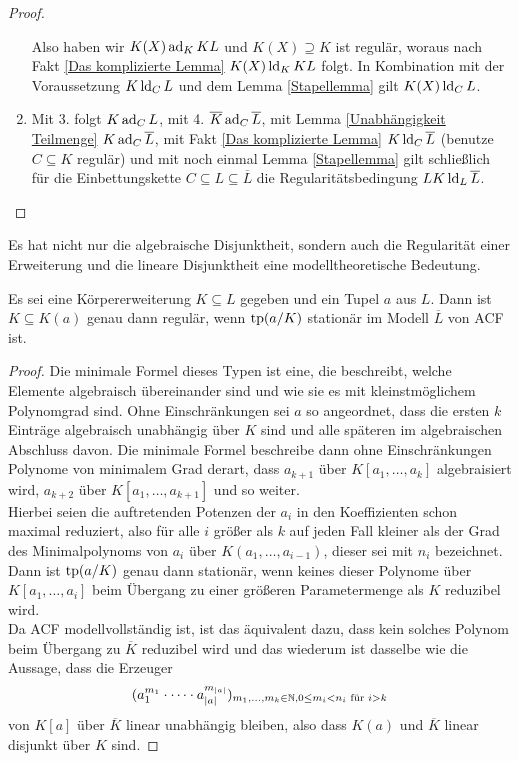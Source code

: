 \begin{proof}
\begin{enumerate}
    		Also haben wir $K(X)\operatorname{ad}_KKL$ und $K(X)\supseteq K$ ist regulär, woraus nach Fakt \ref{Das komplizierte Lemma} $K(X)\operatorname{ld}_KKL$ folgt. In Kombination mit der Voraussetzung $K\operatorname{ld}_CL$ und dem Lemma \ref{Stapellemma} gilt $K(X)\operatorname{ld}_CL$.
    		\item Mit 3. folgt $K\operatorname{ad}_CL$, mit 4. $\overline{K}\operatorname{ad}_C\overline{L}$, mit Lemma \ref{Unabhängigkeit Teilmenge} $K\operatorname{ad}_C\overline{L}$, mit Fakt \ref{Das komplizierte Lemma} $K\operatorname{ld}_C\overline{L}$ (benutze $C\subseteq K$ regulär) und mit noch einmal Lemma \ref{Stapellemma} gilt schließlich für die Einbettungskette $C\subseteq L\subseteq\overline{L}$ die Regularitätsbedingung $LK\operatorname{ld}_L\overline{L}$.
    	\end{enumerate}
    \end{proof}
    
    Es hat nicht nur die algebraische Disjunktheit, sondern auch die Regularität einer Erweiterung und die lineare Disjunktheit eine modelltheoretische Bedeutung.
    
    \begin{lemma}
    	Es sei eine Körpererweiterung $K\subseteq L$ gegeben und ein Tupel $a$ aus $L$. Dann ist $K\subseteq K(a)$ genau dann regulär, wenn $\operatorname{tp}(a/K)$ stationär im Modell $\overline{L}$ von ACF ist.
    \end{lemma}
    \begin{proof}
    	Die minimale Formel dieses Typen ist eine, die beschreibt, welche Elemente algebraisch übereinander sind und wie sie es mit kleinstmöglichem Polynomgrad sind. Ohne Einschränkungen sei $a$ so angeordnet, dass die ersten $k$ Einträge algebraisch unabhängig über $K$ sind und alle späteren im algebraischen Abschluss davon.\newpage
    	Die minimale Formel beschreibe dann ohne Einschränkungen Polynome von minimalem Grad derart, dass $a_{k+1}$ über $K[a_1,\dots,a_k]$ algebraisiert wird, $a_{k+2}$ über $K[a_1,\dots,a_{k+1}]$ und so weiter.\\
    	Hierbei seien die auftretenden Potenzen der $a_i$ in den Koeffizienten schon maximal reduziert, also für alle $i$ größer als $k$ auf jeden Fall kleiner als der Grad des Minimalpolynoms von $a_i$ über $K(a_1,\dots,a_{i-1})$, dieser sei mit $n_i$ bezeichnet. Dann ist $\operatorname{tp}(a/K)$ genau dann stationär, wenn keines dieser Polynome über $K[a_1,\dots,a_i]$ beim Übergang zu einer größeren Parametermenge als $K$ reduzibel wird.\\
    	Da ACF modellvollständig ist, ist das äquivalent dazu, dass kein solches Polynom beim Übergang zu $\overline{K}$ reduzibel wird und das wiederum ist dasselbe wie die Aussage, dass die Erzeuger $$(a_1^{m_1}\cdot\dots\cdot a_{\left| a \right|}^{m_{\left| a \right|}})_{m_1,\dots,m_k\in\mathbb{N},0\leq m_i<n_i\text{ für }i>k}$$ von $K[a]$ über $\overline{K}$ linear unabhängig bleiben, also dass $K(a)$ und $\overline{K}$ linear disjunkt über $K$ sind.
    \end{proof}
    
